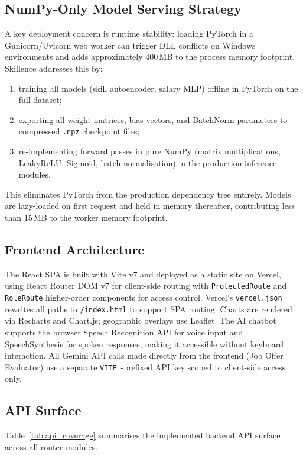 \documentclass[conference]{IEEEtran}
\begin{document}
\subsection{NumPy-Only Model Serving Strategy}
A key deployment concern is runtime stability: loading PyTorch in a
Gunicorn/Uvicorn web worker can trigger DLL conflicts on Windows
environments and adds approximately 400\,MB to the process memory
footprint. Skillence addresses this by:
\begin{enumerate}
\item training all models (skill autoencoder, salary MLP) offline in
      PyTorch on the full dataset;
\item exporting all weight matrices, bias vectors, and BatchNorm
      parameters to compressed \texttt{.npz} checkpoint files;
\item re-implementing forward passes in pure NumPy (matrix
      multiplications, LeakyReLU, Sigmoid, batch normalisation) in
      the production inference modules.
\end{enumerate}
This eliminates PyTorch from the production dependency tree entirely.
Models are lazy-loaded on first request and held in memory thereafter,
contributing less than 15\,MB to the worker memory footprint.

\subsection{Frontend Architecture}
The React SPA is built with Vite v7 and deployed as a static site on
Vercel, using React Router DOM v7 for client-side routing with
\texttt{ProtectedRoute} and \texttt{RoleRoute} higher-order components
for access control. Vercel's \texttt{vercel.json} rewrites all paths to
\texttt{/index.html} to support SPA routing. Charts are rendered via
Recharts and Chart.js; geographic overlays use Leaflet. The AI chatbot
supports the browser Speech Recognition API for voice input and
SpeechSynthesis for spoken responses, making it accessible without
keyboard interaction. All Gemini API calls made directly from the
frontend (Job Offer Evaluator) use a separate \texttt{VITE\_}-prefixed
API key scoped to client-side access only.

\subsection{API Surface}
Table~\ref{tab:api_coverage} summarises the implemented backend
API surface across all router modules.
\end{document}
